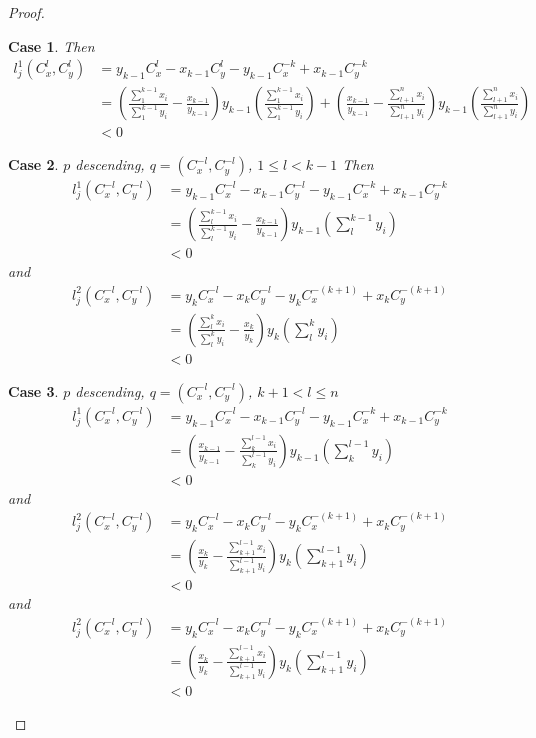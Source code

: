 \documentclass{article}
\theoremstyle{case}
\newtheorem{case}{Case}
\begin{document}
\begin{proof}
\begin{case}
\noindent Then
\begin{align*}
l_j^1\left( C_x^l, C_y^l \right) &= y_{k-1}C_x^l - x_{k-1}C_y^l - y_{k-1}C_x^{-k} + x_{k-1}C_y^{-k} \\
&= \left( \frac{\sum_1^{k-1}x_i}{\sum_1^{k-1}y_i} - \frac{x_{k-1}}{y_{k-1}}\right)y_{k-1}\left( \frac{\sum_1^{k-1}x_i}{\sum_1^{k-1}y_i}\right) + \left( \frac{x_{k-1}}{y_{k-1}} - \frac{\sum_{l+1}^n x_i}{\sum_{l+1}^n y_i}\right)y_{k-1}\left( \frac{\sum_{l+1}^n x_i}{\sum_{l+1}^n y_i}\right) \\
&< 0
\end{align*}
\end{case}

%
%
\begin{case} $p$ descending, $q = \left( C_x^{-l}, C_y^{-l}\right)$, $1 \leq l < k-1$
\noindent Then
\begin{align*}
l_j^1\left( C_x^{-l}, C_y^{-l}\right) &= y_{k-1}C_x^{-l} - x_{k-1}C_y^{-l} - y_{k-1}C_x^{-k} + x_{k-1}C_y^{-k} \\
&= \left( \frac{\sum_l^{k-1}x_i}{\sum_l^{k-1}y_i} - \frac{x_{k-1}}{y_{k-1}}\right)y_{k-1}\left( \sum_l^{k-1}y_i\right) \\
&< 0
\end{align*}
and
\begin{align*}
l_j^2\left(C_x^{-l}, C_y^{-l}\right) &= y_kC_x^{-l} - x_kC_y^{-l} - y_kC_x^{-(k+1)} + x_kC_y^{-(k+1)} \\
&= \left( \frac{\sum_l^k x_i}{\sum_l^k y_i} - \frac{x_k}{y_k}\right)y_k\left( \sum_l^k y_i\right) \\
&< 0
\end{align*}
\end{case}

%
%
\begin{case} $p$ descending, $q = \left( C_x^{-l}, C_y^{-l}\right)$, $k+1 < l \leq n$
\begin{align*}
l_j^1\left(C_x^{-l}, C_y^{-l}\right) &= y_{k-1}C_x^{-l} - x_{k-1}C_y^{-l} - y_{k-1}C_x^{-k} + x_{k-1}C_y^{-k} \\
&= \left( \frac{x_{k-1}}{y_{k-1}} - \frac{\sum_k^{l-1} x_i}{\sum_k^{l-1} y_i}\right)y_{k-1}\left( \sum_k^{l-1}y_i\right) \\
&< 0
\end{align*}
and
\begin{align*}
l_j^2\left(C_x^{-l}, C_y^{-l}\right) &= y_kC_x^{-l} - x_kC_y^{-l} - y_kC_x^{-(k+1)} + x_kC_y^{-(k+1)} \\
&= \left( \frac{x_k}{y_k} - \frac{\sum_{k+1}^{l-1}x_i}{\sum_{k+1}^{l-1}y_i}\right)y_k\left( \sum_{k+1}^{l-1} y_i\right) \\
&< 0
\end{align*}
and 
\begin{align*}
l_j^2\left(C_x^{-l}, C_y^{-l}\right) &= y_kC_x^{-l} - x_kC_y^{-l} - y_kC_x^{-(k+1)} + x_kC_y^{-(k+1)} \\
&= \left( \frac{x_k}{y_k} - \frac{\sum_{k+1}^{l-1}x_i}{\sum_{k+1}^{l-1}y_i}\right)y_k\left( \sum_{k+1}^{l-1}y_i\right) \\
&< 0
\end{align*}
\end{case}


\end{proof}
\end{document}
